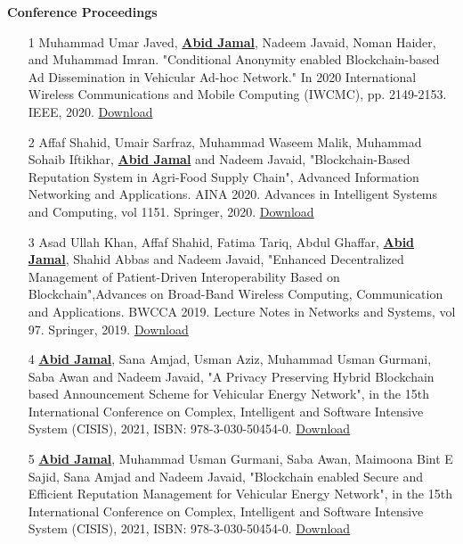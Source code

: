 
\begin{center}
	{\fontsize{16}{15} \bf Conference Proceedings \\ \vspace{0.3cm}
		}
	\vspace{0.4cm}
\end{center}
\normalsize
\begin{itemize}
\item[1] Muhammad Umar Javed, \underline{\textbf{Abid Jamal}}, Nadeem Javaid, Noman Haider, and Muhammad Imran. "Conditional Anonymity enabled Blockchain-based Ad Dissemination in Vehicular Ad-hoc Network." In 2020 International Wireless Communications and Mobile Computing (IWCMC), pp. 2149-2153. IEEE, 2020. {\href{https://ieeexplore.ieee.org/abstract/document/9148487}{Download}}

\item[2] Affaf Shahid, Umair Sarfraz, Muhammad Waseem Malik, Muhammad Sohaib Iftikhar, \underline{\textbf{Abid Jamal}} and Nadeem Javaid, "Blockchain-Based Reputation System in Agri-Food Supply Chain", Advanced Information Networking and Applications. AINA 2020. Advances in Intelligent Systems and Computing, vol 1151. Springer, 2020. {\href{https://link.springer.com/chapter/10.1007/978-3-030-44041-1_2}{Download}}

\item[3] Asad Ullah Khan, Affaf Shahid, Fatima Tariq, Abdul Ghaffar, \underline{\textbf{Abid Jamal}}, Shahid Abbas and Nadeem Javaid, "Enhanced Decentralized Management of Patient-Driven Interoperability Based on Blockchain",Advances on Broad-Band Wireless Computing, Communication and Applications. BWCCA 2019. Lecture Notes in Networks and Systems, vol 97. Springer, 2019. {\href{https://link.springer.com/chapter/10.1007/978-3-030-33506-9_74}{Download}}

\item[4] \underline{\textbf{ Abid Jamal}}, Sana Amjad, Usman Aziz, Muhammad Usman Gurmani, Saba Awan and Nadeem Javaid, "A Privacy Preserving Hybrid Blockchain based Announcement Scheme for Vehicular Energy Network", in the 15th International Conference on Complex, Intelligent and Software Intensive System (CISIS), 2021, ISBN: 978-3-030-50454-0.
{\href{https://www.researchgate.net/publication/351133979_A_Privacy_Preserving_Hybrid_Blockchain_based_Announcement_Scheme_for_Vehicular_Energy_Network}{Download}}

\item[5] \underline{\textbf{Abid Jamal}}, Muhammad Usman Gurmani, Saba Awan, Maimoona Bint E Sajid, Sana Amjad and Nadeem Javaid, "Blockchain enabled Secure and Efficient Reputation Management for Vehicular Energy Network", in the 15th International Conference on Complex, Intelligent and Software Intensive System (CISIS), 2021, ISBN: 978-3-030-50454-0.
{\href{https://www.researchgate.net/publication/351133976_Blockchain_enabled_Secure_and_Efficient_Reputation_Management_for_Vehicular_Energy_Network}{Download}}


\end{itemize}
\clearpage
\newpage 